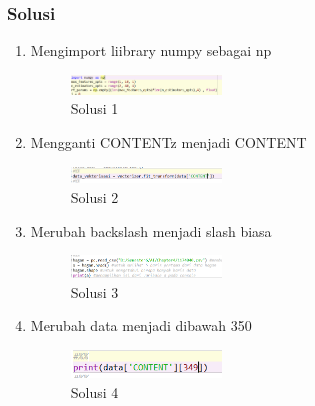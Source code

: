         \subsubsection{Solusi}
        \begin{enumerate}
            \item Mengimport liibrary numpy sebagai np
            \begin{figure}[H]
                \includegraphics[width=4cm]{figures/1174040/chapter4/solution1.png}
                \centering
                \caption{Solusi 1}
            \end{figure}
            \item Mengganti CONTENTz menjadi CONTENT
            \begin{figure}[H]
                \includegraphics[width=4cm]{figures/1174040/chapter4/solution2.png}
                \centering
                \caption{Solusi 2}
            \end{figure}
            \item Merubah backslash menjadi slash biasa
            \begin{figure}[H]
                \includegraphics[width=4cm]{figures/1174040/chapter4/solution3.png}
                \centering
                \caption{Solusi 3}
            \end{figure}
            \item Merubah data menjadi dibawah 350
            \begin{figure}[H]
                \includegraphics[width=4cm]{figures/1174040/chapter4/solution4.png}
                \centering
                \caption{Solusi 4}
            \end{figure}
        \end{enumerate}